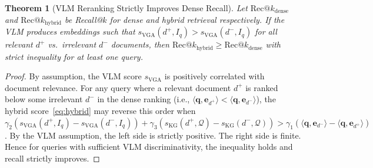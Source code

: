 \documentclass[10pt,conference]{IEEEtran}
\theoremstyle{ieeethm}
\newtheorem{theorem}{Theorem}
\theoremstyle{ieeedef}
\theoremstyle{ieeeremark}
\begin{document}
\begin{theorem}[VLM Reranking Strictly Improves Dense Recall]
\label{thm:vlm_improve}
Let $\text{Rec}@k_\text{dense}$ and $\text{Rec}@k_\text{hybrid}$ be Recall@$k$ for dense and hybrid retrieval respectively. If the VLM produces embeddings such that $s_\text{VGA}(d^+, I_q) > s_\text{VGA}(d^-, I_q)$ for all relevant $d^+$ vs.\ irrelevant $d^-$ documents, then $\text{Rec}@k_\text{hybrid} \geq \text{Rec}@k_\text{dense}$ with strict inequality for at least one query.
\end{theorem}
\begin{proof}
By assumption, the VLM score $s_\text{VGA}$ is positively correlated with document relevance. For any query where a relevant document $d^+$ is ranked below some irrelevant $d^-$ in the dense ranking (i.e., $\langle\mathbf{q},\mathbf{e}_{d^+}\rangle < \langle\mathbf{q},\mathbf{e}_{d^-}\rangle$), the hybrid score~\eqref{eq:hybrid} may reverse this order when $\gamma_2(s_\text{VGA}(d^+,I_q) - s_\text{VGA}(d^-,I_q)) + \gamma_3(s_\text{KG}(d^+,\mathcal{Q}) - s_\text{KG}(d^-,\mathcal{Q})) > \gamma_1(\langle\mathbf{q},\mathbf{e}_{d^-}\rangle - \langle\mathbf{q},\mathbf{e}_{d^+}\rangle)$. By the VLM assumption, the left side is strictly positive. The right side is finite. Hence for queries with sufficient VLM discriminativity, the inequality holds and recall strictly improves.
\end{proof}
\end{document}
